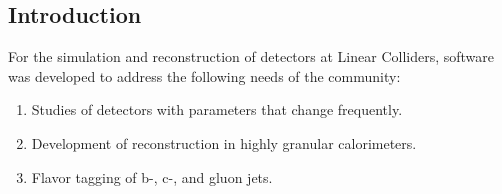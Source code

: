 \subsection{Introduction}
For the simulation and reconstruction of detectors at Linear Colliders, software was developed to address the following needs of the community:
\begin{enumerate}
	\item Studies of detectors with parameters that change frequently.
	\item Development of reconstruction in highly granular calorimeters.
	\item Flavor tagging of b-, c-, and gluon jets.
\end{enumerate}
